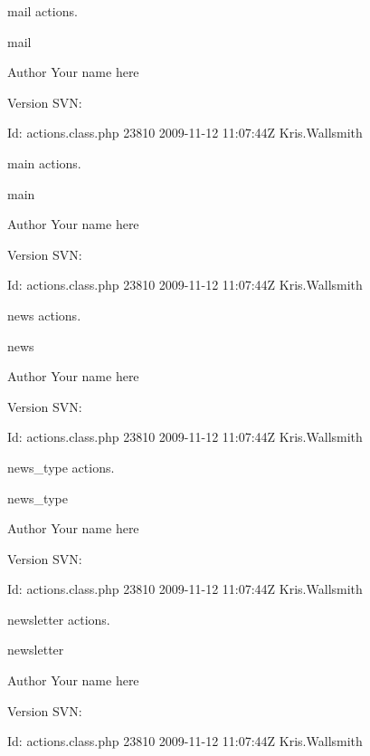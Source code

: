 mail actions.

mail \begin{DoxyAuthor}{Author}
Your name here 
\end{DoxyAuthor}
\begin{DoxyVersion}{Version}
S\-V\-N\-: 
\end{DoxyVersion}
\begin{DoxyParagraph}{Id\-:}
actions.\-class.\-php 23810 2009-\/11-\/12 11\-:07\-:44\-Z Kris.\-Wallsmith 
\end{DoxyParagraph}


main actions.

main \begin{DoxyAuthor}{Author}
Your name here 
\end{DoxyAuthor}
\begin{DoxyVersion}{Version}
S\-V\-N\-: 
\end{DoxyVersion}
\begin{DoxyParagraph}{Id\-:}
actions.\-class.\-php 23810 2009-\/11-\/12 11\-:07\-:44\-Z Kris.\-Wallsmith 
\end{DoxyParagraph}


news actions.

news \begin{DoxyAuthor}{Author}
Your name here 
\end{DoxyAuthor}
\begin{DoxyVersion}{Version}
S\-V\-N\-: 
\end{DoxyVersion}
\begin{DoxyParagraph}{Id\-:}
actions.\-class.\-php 23810 2009-\/11-\/12 11\-:07\-:44\-Z Kris.\-Wallsmith 
\end{DoxyParagraph}


news\-\_\-type actions.

news\-\_\-type \begin{DoxyAuthor}{Author}
Your name here 
\end{DoxyAuthor}
\begin{DoxyVersion}{Version}
S\-V\-N\-: 
\end{DoxyVersion}
\begin{DoxyParagraph}{Id\-:}
actions.\-class.\-php 23810 2009-\/11-\/12 11\-:07\-:44\-Z Kris.\-Wallsmith 
\end{DoxyParagraph}


newsletter actions.

newsletter \begin{DoxyAuthor}{Author}
Your name here 
\end{DoxyAuthor}
\begin{DoxyVersion}{Version}
S\-V\-N\-: 
\end{DoxyVersion}
\begin{DoxyParagraph}{Id\-:}
actions.\-class.\-php 23810 2009-\/11-\/12 11\-:07\-:44\-Z Kris.\-Wallsmith 
\end{DoxyParagraph}


